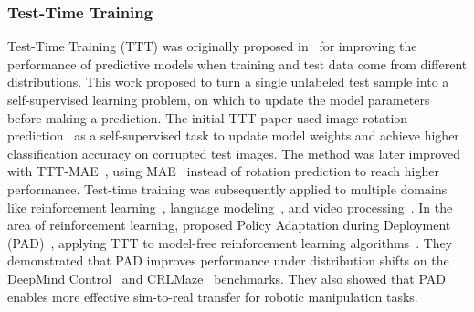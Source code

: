 \subsubsection{Test-Time Training}

Test-Time Training (TTT) was originally proposed in~\citet{sun2020test} for improving the performance of predictive models when training and test data come from different distributions. This work proposed to turn a single unlabeled test sample into a self-supervised learning problem, on which to update the model parameters before making a prediction. The initial TTT paper used image rotation prediction~\citep{gidaris2018unsupervised} as a self-supervised task to update model weights and achieve higher classification accuracy on corrupted test images. The method was later improved with TTT-MAE~\citep{gandelsman2022test}, using MAE~\citep{he2022masked} instead of rotation prediction to reach higher performance. Test-time training was subsequently applied to multiple domains like reinforcement learning~\citep{hansen2021self}, language modeling~\citep{hardt2023test}, and video processing~\citep{wang2025test}. In the area of reinforcement learning, \citet{hansen2021self} proposed Policy Adaptation during Deployment (PAD)~\citep{hansen2021self}, applying TTT to model-free reinforcement learning algorithms~\citep{haarnoja2018soft, mnih2016asynchronous}. They demonstrated that PAD improves performance under distribution shifts on the DeepMind Control~\citep{tassa2018deepmind} and CRLMaze~\citep{lomonaco2020continual} benchmarks. They also showed that PAD enables more effective sim-to-real transfer for robotic manipulation tasks.